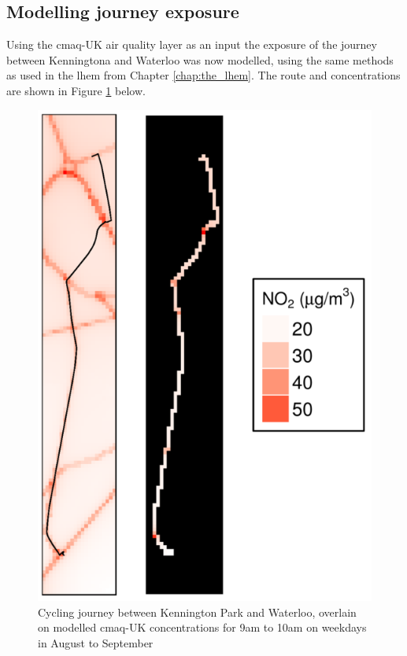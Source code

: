 \subsection{Modelling journey exposure}
\label{subsec:modellingjourneyexposure}

Using the \gls{cmaq}-UK air quality layer as an input the exposure of the journey between Kenningtona and Waterloo was now modelled, using the same methods as used in the \gls{lhem} from Chapter \ref{chap:the_lhem}. The route and concentrations are shown in Figure \ref{fig:dual_exposure_cycling} below.

\begin{figure}[H]
\centering
\includegraphics[scale=1.4]{images/dual_exposure_cycling.png}
\caption{Cycling journey between Kennington Park and Waterloo, overlain on modelled \gls{cmaq}-UK concentrations for 9am to 10am on weekdays in August to September}
\label{fig:dual_exposure_cycling}
\end{figure}


